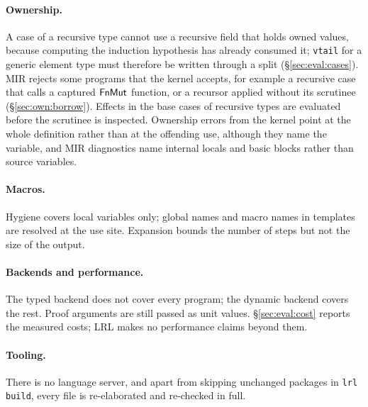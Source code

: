 \paragraph{Ownership.}
A case of a recursive type cannot use a recursive field that holds owned values, because computing the induction hypothesis has already consumed it; \lstinline|vtail| for a generic element type must therefore be written through a split (\S\ref{sec:eval:cases}).
MIR rejects some programs that the kernel accepts, for example a recursive case that calls a captured $\mathsf{FnMut}$ function, or a recursor applied without its scrutinee (\S\ref{sec:own:borrow}).
Effects in the base cases of recursive types are evaluated before the scrutinee is inspected.
Ownership errors from the kernel point at the whole definition rather than at the offending use, although they name the variable, and MIR diagnostics name internal locals and basic blocks rather than source variables.

\paragraph{Macros.}
Hygiene covers local variables only; global names and macro names in templates are resolved at the use site.
Expansion bounds the number of steps but not the size of the output.

\paragraph{Backends and performance.}
The typed backend does not cover every program; the dynamic backend covers the rest.
Proof arguments are still passed as unit values.
\S\ref{sec:eval:cost} reports the measured costs; LRL makes no performance claims beyond them.

\paragraph{Tooling.}
There is no language server, and apart from skipping unchanged packages in \texttt{lrl build}, every file is re-elaborated and re-checked in full.
